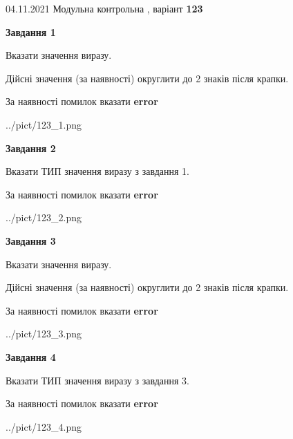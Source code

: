 \documentclass[11pt, ukrainian]{article}
\begin{document}
{04.11.2021 Модульна контрольна , варіант  \No \textbf { 123 }\par}
{
\begin {large}
{\begin {center}\textbf{Завдання 1}\end {center}}\par
Вказати значення виразу. \par
Дійсні значення (за наявності) округлити до 2 знаків після крапки. \par
За наявності помилок вказати \textbf{error}

\begin{center}
	{../pict/123_1.png}
\end{center}
\newpage

{\begin {center}\textbf{Завдання 2}\end {center}}\par
Вказати ТИП значення виразу з завдання 1. \par
За наявності помилок вказати \textbf{error}

\begin{center}
	{../pict/123_2.png}
\end{center}
\newpage

{\begin {center}\textbf{Завдання 3}\end {center}}\par
Вказати значення виразу. \par
Дійсні значення (за наявності) округлити до 2 знаків після крапки. \par
За наявності помилок вказати \textbf{error}

\begin{center}
	{../pict/123_3.png}
\end{center}
\newpage

{\begin {center}\textbf{Завдання 4}\end {center}}\par
Вказати ТИП значення виразу з завдання 3. \par
За наявності помилок вказати \textbf{error}

\begin{center}
	{../pict/123_4.png}
\end{center}
\newpage


\end{large}}
\end{document}
